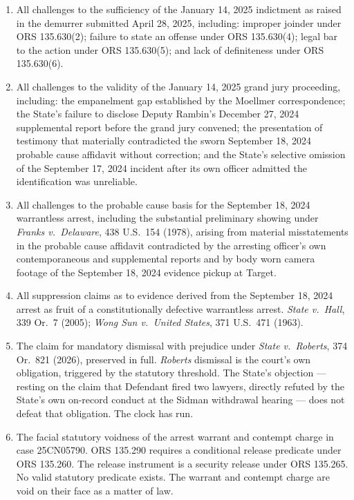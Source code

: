 \documentclass[12pt,letterpaper]{article}
\begin{document}
\begin{enumerate}[leftmargin=*, label=\arabic*., itemsep=4pt]

\item All challenges to the sufficiency of the January 14, 2025 indictment as
raised in the demurrer submitted April 28, 2025, including: improper joinder
under ORS 135.630(2); failure to state an offense under ORS 135.630(4); legal
bar to the action under ORS 135.630(5); and lack of definiteness under
ORS 135.630(6).

\item All challenges to the validity of the January 14, 2025 grand jury
proceeding, including: the empanelment gap established by the Moellmer
correspondence; the State's failure to disclose Deputy Rambin's December 27,
2024 supplemental report before the grand jury convened; the presentation of
testimony that materially contradicted the sworn September 18, 2024 probable
cause affidavit without correction; and the State's selective omission of the
September 17, 2024 incident after its own officer admitted the identification
was unreliable.

\item All challenges to the probable cause basis for the September 18, 2024
warrantless arrest, including the substantial preliminary showing under
\textit{Franks v.\ Delaware}, 438 U.S.\ 154 (1978), arising from material
misstatements in the probable cause affidavit contradicted by the arresting
officer's own contemporaneous and supplemental reports and by body worn camera
footage of the September 18, 2024 evidence pickup at Target.

\item All suppression claims as to evidence derived from the September 18, 2024
arrest as fruit of a constitutionally defective warrantless arrest.
\textit{State v.\ Hall}, 339 Or.\ 7 (2005); \textit{Wong Sun v.\ United States},
371 U.S.\ 471 (1963).

\item The claim for mandatory dismissal with prejudice under \textit{State v.\
Roberts}, 374 Or.\ 821 (2026), preserved in full. \textit{Roberts} dismissal is
the court's own obligation, triggered by the statutory threshold. The State's
objection --- resting on the claim that Defendant fired two lawyers, directly
refuted by the State's own on-record conduct at the Sidman withdrawal hearing ---
does not defeat that obligation. The clock has run.

\item The facial statutory voidness of the arrest warrant and contempt charge in
case 25CN05790. ORS 135.290 requires a conditional release predicate under
ORS 135.260. The release instrument is a security release under ORS 135.265.
No valid statutory predicate exists. The warrant and contempt charge are void
on their face as a matter of law.


\end{enumerate}
\end{document}
